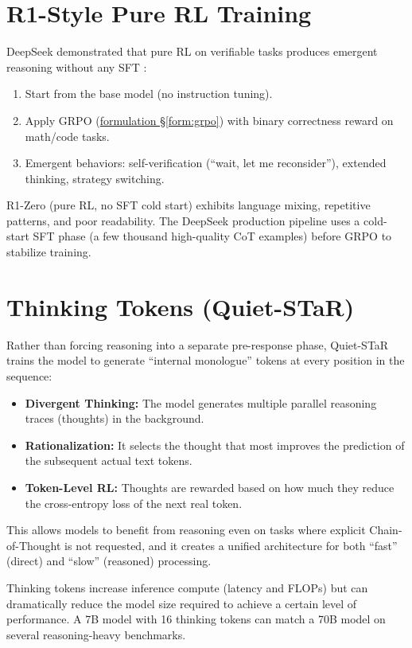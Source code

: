 \section{R1-Style Pure RL Training}

DeepSeek demonstrated that pure RL on verifiable tasks produces emergent reasoning without any SFT \parencite{guo2025deepseekr1}:
\begin{enumerate}
  \item Start from the base model (no instruction tuning).
  \item Apply GRPO (\hyperref[form:grpo]{formulation \S\ref*{form:grpo}}) with binary correctness reward on math/code tasks.
  \item Emergent behaviors: self-verification (``wait, let me reconsider''), extended thinking, strategy switching.
\end{enumerate}

\begin{warningbox}
R1-Zero (pure RL, no SFT cold start) exhibits language mixing, repetitive patterns, and poor readability. The DeepSeek production pipeline uses a cold-start SFT phase (a few thousand high-quality CoT examples) before GRPO to stabilize training.
\end{warningbox}
\section{Thinking Tokens (Quiet-STaR)}

Rather than forcing reasoning into a separate pre-response phase, Quiet-STaR \parencite{schulman2024quietstar} trains the model to generate ``internal monologue'' tokens at every position in the sequence:
\begin{itemize}
  \item \textbf{Divergent Thinking:} The model generates multiple parallel reasoning traces (thoughts) in the background.
  \item \textbf{Rationalization:} It selects the thought that most improves the prediction of the subsequent actual text tokens.
  \item \textbf{Token-Level RL:} Thoughts are rewarded based on how much they reduce the cross-entropy loss of the next real token.
\end{itemize}
This allows models to benefit from reasoning even on tasks where explicit Chain-of-Thought is not requested, and it creates a unified architecture for both ``fast'' (direct) and ``slow'' (reasoned) processing.

\begin{keyinsight}
Thinking tokens increase inference compute (latency and FLOPs) but can dramatically reduce the model size required to achieve a certain level of performance. A 7B model with 16 thinking tokens can match a 70B model on several reasoning-heavy benchmarks.
\end{keyinsight}
